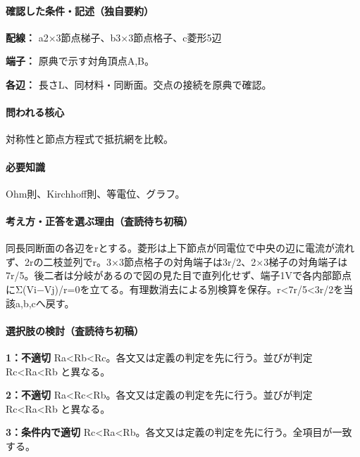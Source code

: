 \paragraph{確認した条件・記述（独自要約）}\mbox{}\par

\noindent\textbf{配線：} a2×3節点梯子、b3×3節点格子、c菱形5辺\par

\noindent\textbf{端子：} 原典で示す対角頂点A,B。\par

\noindent\textbf{各辺：} 長さL、同材料・同断面。交点の接続を原典で確認。\par

\paragraph{問われる核心} 対称性と節点方程式で抵抗網を比較。

\paragraph{必要知識} Ohm則、Kirchhoff則、等電位、グラフ。

\paragraph{考え方・正答を選ぶ理由（査読待ち初稿）} 同長同断面の各辺をrとする。菱形は上下節点が同電位で中央の辺に電流が流れず、2rの二枝並列でr。3×3節点格子の対角端子は3r/2、2×3梯子の対角端子は7r/5。後二者は分岐があるので図の見た目で直列化せず、端子1Vで各内部節点にΣ(Vi−Vj)/r=\allowbreak{}0を立てる。有理数消去による別検算を保存。r<7r/5<3r/2を当該a,b,cへ戻す。

\paragraph{選択肢の検討（査読待ち初稿）}\mbox{}\par

\noindent\textbf{1：不適切} Ra<Rb<Rc。各文又は定義の判定を先に行う。並びが判定 Rc<Ra<Rb と異なる。\par

\noindent\textbf{2：不適切} Ra<Rc<Rb。各文又は定義の判定を先に行う。並びが判定 Rc<Ra<Rb と異なる。\par

\noindent\textbf{3：条件内で適切} Rc<Ra<Rb。各文又は定義の判定を先に行う。全項目が一致する。\par

